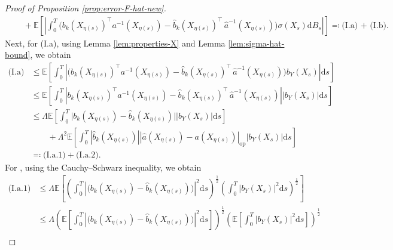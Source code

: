 \documentclass{article}
\theoremstyle{plain}
\theoremstyle{definition}
\theoremstyle{remark}
\renewcommand{\d}{\mathrm{d}}
\newcommand{\EE}{\mathbb{E}}
\begin{document}
\begin{proof}[Proof of Proposition \ref{prop:error-F-hat-new}]
\begin{align}
 &\quad +\EE \left[\left|\int_{0}^T \Big( b_k(X_{\eta(s)})^{\top}a^{-1}(X_{\eta(s)})-\widehat b_k(X_{\eta(s)})^{\top}\,\widehat{a}^{-1}(X_{\eta(s)})\Big)\sigma(X_s) \d B_s \right|\right]\eqqcolon \text{(I.a) + (I.b)}.
\end{align}
Next, for (I.a), using  Lemma \ref{lem:properties-X} and Lemma \ref{lem:sigma-hat-bound},  we obtain 
\begin{align}\label{eq:I-a}
    \text{(I.a)}&\leq \EE \left[\int_{0}^T \left|\Big( b_k(X_{\eta(s)})^{\top}a^{-1}(X_{\eta(s)})-\widehat b_k(X_{\eta(s)})^{\top}\,\widehat{a}^{-1}(X_{\eta(s)})\Big)b_Y(X_s) \right|\d s \right]\nonumber\\
    &\leq \EE \left[\int_{0}^T \left| b_k(X_{\eta(s)})^{\top}a^{-1}(X_{\eta(s)})-\widehat b_k(X_{\eta(s)})^{\top}\,\widehat{a}^{-1}(X_{\eta(s)})\right| \left|b_Y(X_s) \right|\d s \right]\nonumber\\
    &\leq \Lambda\EE \left[\int_{0}^T  \big|{b}_k(X_{\eta(s)})-\widehat b_k(X_{\eta(s)})\big|\left|b_Y(X_s) \right| \d s \right] \nonumber\\
    &\qquad + \Lambda^2\EE \left[\int_{0}^T |\widehat{b}_k(X_{\eta(s)})|\left|\widehat{a}(X_{\eta(s)})-a(X_{\eta(s)})\right|_{\mathrm{op}}\left|b_Y(X_s) \right| \d s \right] \nonumber\\
    &\eqqcolon \text{(I.a.1)}+\text{(I.a.2)}. 
\end{align}
For , using the Cauchy–Schwarz inequality,  we obtain 
\begin{align}\label{eq:I-a}
    \text{(I.a.1)}%
    &\leq \Lambda\EE \left[\left(\int_{0}^T \left|\big( b_k(X_{\eta(s)})-\widehat b_k(X_{\eta(s)})\big)\right|^2\d s\right)^{\frac{1}{2}}\left(\int_{0}^T\left|b_Y(X_s) \right|^2\d s\right)^{\frac{1}{2}} \right]\nonumber\\
    &\leq \Lambda \left(\EE \left[\int_{0}^T \left|\big( b_k(X_{\eta(s)})-\widehat b_k(X_{\eta(s)})\big)\right|^2\d s\right]\right)^{\frac{1}{2}}\left(\EE \left[\int_{0}^T\left|b_Y(X_s) \right|^2\d s \right]\right)^{\frac{1}{2}}\nonumber\\

\end{align}
\end{proof}
\end{document}
